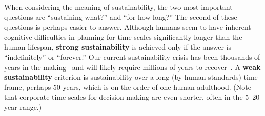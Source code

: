 \documentclass{article}\usepackage[]{graphicx}\usepackage[]{xcolor}
\begin{document}
When considering the meaning of sustainability, 
the two most important questions are
``sustaining what?'' and ``for how long?''
The second of these questions is perhaps easier to answer.
Although humans seem to have inherent cognitive difficulties in planning for
time scales significantly longer than the human lifespan,
\textbf{strong sustainability} is achieved only if the answer is
``indefinitely'' or ``forever.''
Our current sustainability crisis has been thousands of years in the making~\cite{Sanderman2017}
and will likely require millions of years to recover~\cite{Davis11262}.
A \textbf{weak sustainability} criterion is sustainability over a long
(by human standards) time frame, perhaps 50 years, 
which is on the order of one human adulthood.%
(Note that corporate time scales for decision making are even shorter,
often in the 5--20 year range.)
\end{document}
